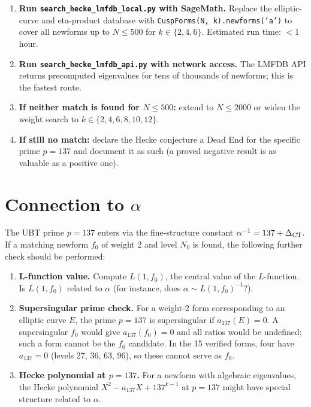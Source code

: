 \documentclass[12pt,a4paper]{article}
\begin{document}
\begin{enumerate}
  \item \textbf{Run \texttt{search\_hecke\_lmfdb\_local.py} with SageMath.}
    Replace the elliptic-curve and eta-product database with
    \texttt{CuspForms(N, k).newforms('a')} to cover all newforms up to $N \le 500$
    for $k \in \{2, 4, 6\}$.  Estimated run time: $<1$ hour.

  \item \textbf{Run \texttt{search\_hecke\_lmfdb\_api.py} with network access.}
    The LMFDB API returns precomputed eigenvalues for tens of thousands of
    newforms; this is the fastest route.

  \item \textbf{If neither match is found for $N \le 500$:} extend to $N \le 2000$
    or widen the weight search to $k \in \{2, 4, 6, 8, 10, 12\}$.

  \item \textbf{If still no match:} declare the Hecke conjecture a Dead End for the
    specific prime $p = 137$ and document it as such (a proved negative result is
    as valuable as a positive one).
\end{enumerate}

\section{Connection to \texorpdfstring{$\alpha$}{alpha}}

The UBT prime $p = 137$ enters via the fine-structure constant $\alpha^{-1}
= 137 + \Delta_{\rm CT}$.  If a matching newform $f_0$ of weight 2 and level
$N_0$ is found, the following further check should be performed:

\begin{enumerate}
  \item \textbf{L-function value.}
    Compute $L(1, f_0)$, the central value of the $L$-function.
    Is $L(1, f_0)$ related to $\alpha$ (for instance, does $\alpha \sim
    L(1, f_0)^{-1}$?).

  \item \textbf{Supersingular prime check.}
    For a weight-2 form corresponding to an elliptic curve $E$, the prime
    $p = 137$ is supersingular if $a_{137}(E) = 0$.  A supersingular $f_0$ would
    give $a_{137}(f_0) = 0$ and all ratios would be undefined; such a form
    cannot be the $f_0$ candidate.  In the 15 verified forms, four have
    $a_{137} = 0$ (levels 27, 36, 63, 96), so these cannot serve as $f_0$.

  \item \textbf{Hecke polynomial at $p = 137$.}
    For a newform with algebraic eigenvalues, the Hecke polynomial
    $X^2 - a_{137}X + 137^{k-1}$ at $p = 137$ might have special structure
    related to $\alpha$.
\end{enumerate}
\end{document}

